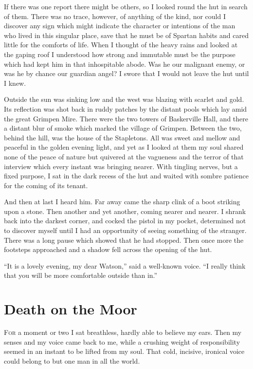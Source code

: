 \documentclass[paper=5.5in:8.5in,BCOR=7mm,twoside,DIV=calc,12pt,usegeometry,openany,chapterprefix,endperiod]{scrbook} %
\begin{document}
If there was one report there might be others, so I looked round the hut in search of them. There was no trace, however, of anything of the kind, nor could I discover any sign which might indicate the character or intentions of the man who lived in this singular place, save that he must be of Spartan habits and cared little for the comforts of life. When I thought of the heavy rains and looked at the gaping roof I understood how strong and immutable must be the purpose which had kept him in that inhospitable abode. Was he our malignant enemy, or was he by chance our guardian angel? I swore that I would not leave the hut until I knew.

Outside the sun was sinking low and the west was blazing with scarlet and gold. Its reflection was shot back in ruddy patches by the distant pools which lay amid the great Grimpen Mire. There were the two towers of Baskerville Hall, and there a distant blur of smoke which marked the village of Grimpen. Between the two, behind the hill, was the house of the Stapletons. All was sweet and mellow and peaceful in the golden evening light, and yet as I looked at them my soul shared none of the peace of nature but quivered at the vagueness and the terror of that interview which every instant was bringing nearer. With tingling nerves, but a fixed purpose, I sat in the dark recess of the hut and waited with sombre patience for the coming of its tenant.

And then at last I heard him. Far away came the sharp clink of a boot striking upon a stone. Then another and yet another, coming nearer and nearer. I shrank back into the darkest corner, and cocked the pistol in my pocket, determined not to discover myself until I had an opportunity of seeing something of the stranger. There was a long pause which showed that he had stopped. Then once more the footsteps approached and a shadow fell across the opening of the hut.

\enquote{It is a lovely evening, my dear Watson,} said a well-known voice. \enquote{I really think that you will be more comfortable outside than in.}

\chapter{Death on the Moor}
\lettrine[lines=1]{F}{or} a moment or two I sat breathless, hardly able to believe my ears. Then my senses and my voice came back to me, while a crushing weight of responsibility seemed in an instant to be lifted from my soul. That cold, incisive, ironical voice could belong to but one man in all the world.
\end{document}
